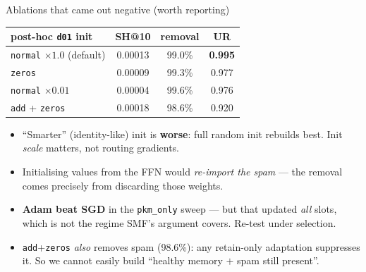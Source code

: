 \documentclass{beamer}
\begin{document}
\begin{frame}{Ablations that came out negative (worth reporting)}
\begin{center}
\begin{tabular}{|l|c|c|c|}
\hline
post-hoc \texttt{d01} init & SH@10 & removal & UR \\
\hline
\texttt{normal} $\times 1.0$ (default) & 0.00013 & 99.0\% & \textbf{0.995} \\
\texttt{zeros}                          & 0.00009 & 99.3\% & 0.977 \\
\texttt{normal} $\times 0.01$           & 0.00004 & 99.6\% & 0.976 \\
\texttt{add} + \texttt{zeros}           & 0.00018 & 98.6\% & 0.920 \\
\hline
\end{tabular}
\end{center}

\begin{itemize}
  \item ``Smarter'' (identity-like) init is \textbf{worse}: full random init
        rebuilds best. Init \emph{scale} matters, not routing gradients.
  \item Initialising values from the FFN would \emph{re-import the spam} ---
        the removal comes precisely from discarding those weights.
  \item \textbf{Adam beat SGD} in the \texttt{pkm\_only} sweep --- but that
        updated \emph{all} slots, which is not the regime SMF's argument covers.
        Re-test under selection.
  \item \texttt{add}+\texttt{zeros} \emph{also} removes spam (98.6\%): any
        retain-only adaptation suppresses it. \alert{So we cannot easily build
        ``healthy memory $+$ spam still present''.}
\end{itemize}
\end{frame}
\end{document}
